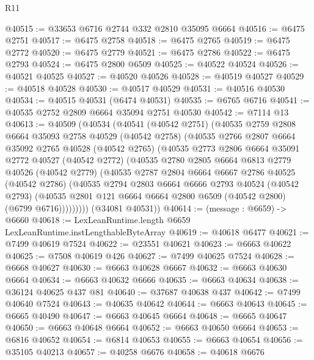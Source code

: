 \begin{lexlean}{R11}
\begin{coremodule}
@40515 := @33653 @6716 @2744 @332 @2810 @35095 @6664
@40516 := @6475 @2751
@40517 := @6475 @2758
@40518 := @6475 @2765
@40519 := @6475 @2772
@40520 := @6475 @2779
@40521 := @6475 @2786
@40522 := @6475 @2793
@40524 := @6475 @2800 @6509
@40525 := @40522 @40524
@40526 := @40521 @40525
@40527 := @40520 @40526
@40528 := @40519 @40527
@40529 := @40518 @40528
@40530 := @40517 @40529
@40531 := @40516 @40530
@40534 := @40515 @40531 (@6474 @40531)
@40535 := @6765 @6716
@40541 := @40535 @2752 @2809 @6664 @35094 @2751 @40530
@40542 := @7114 @13
@40613 := @40509
    (@40534
      (@40541
        (@40542 @2751)
        (@40535
          @2759
          @2808
          @6664
          @35093
          @2758
          @40529
          (@40542 @2758)
          (@40535
            @2766
            @2807
            @6664
            @35092
            @2765
            @40528
            (@40542 @2765)
            (@40535
              @2773
              @2806
              @6664
              @35091
              @2772
              @40527
              (@40542 @2772)
              (@40535
                @2780
                @2805
                @6664
                @6813
                @2779
                @40526
                (@40542 @2779)
                (@40535
                  @2787
                  @2804
                  @6664
                  @6667
                  @2786
                  @40525
                  (@40542 @2786)
                  (@40535
                    @2794
                    @2803
                    @6664
                    @6666
                    @2793
                    @40524
                    (@40542 @2793)
                    (@40535 @2801 @121 @6664 @6664 @2800 @6509 (@40542 @2800) (@6799 @6716)))))))))
      (@34081 @40531))
@40614 := (message : @6659) -> @6660
@40618 := LexLeanRuntime.length @6659 LexLeanRuntime.instLengthableByteArray
@40619 := @40618 @6477
@40621 := @7499 @40619 @7524
@40622 := @23551 @40621
@40623 := @6663 @40622
@40625 := @7508 @40619 @426
@40627 := @7499 @40625 @7524
@40628 := @6668 @40627
@40630 := @6663 @40628 @6667
@40632 := @6663 @40630 @6664
@40634 := @6663 @40632 @6666
@40635 := @6663 @40634
@40638 := @36124 @40625 @437 @81
@40640 := @37687 @40638 @437
@40642 := @7499 @40640 @7524
@40643 := @40635 @40642
@40644 := @6663 @40643
@40645 := @6665 @40490
@40647 := @6663 @40645 @6664
@40648 := @6665 @40647
@40650 := @6663 @40648 @6664
@40652 := @6663 @40650 @6664
@40653 := @6816 @40652
@40654 := @6814 @40653
@40655 := @6663 @40654
@40656 := @35105 @40213
@40657 := @40258 @6676
@40658 := @40618 @6676

\end{coremodule}
\end{lexlean}

